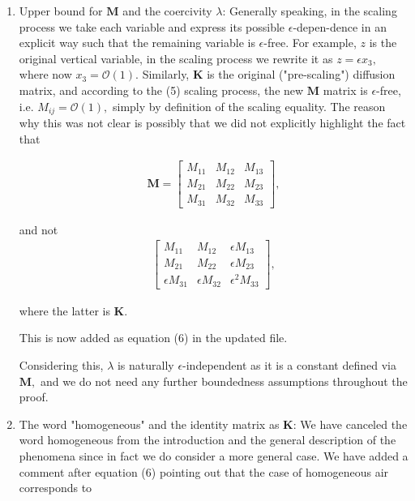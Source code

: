 \documentclass[11pt]{article}
\begin{document}
\begin{enumerate}

  \item Upper bound for $\mathbf{M}$ and the coercivity $\lambda$: Generally speaking, in the scaling process we take each variable and express its possible $\epsilon$-depen-dence in an explicit way such that the remaining variable is $\epsilon$-free. For example, $z$ is the original vertical variable, in the scaling process we rewrite it as $z = \epsilon x_3,$ where now $x_3 = \mathcal{O}(1).$ Similarly, $\mathbf{K}$ is the original ("pre-scaling") diffusion matrix, and according to the (5) scaling process, the new $\mathbf{M}$ matrix is $\epsilon$-free, i.e. $M_{ij} = \mathcal{O}(1),$ simply by definition of the scaling equality. The reason why this was not clear is possibly that we did not explicitly highlight the fact that
  
\begin{gather} \nonumber
 \mathbf{M}
 =
  \begin{bmatrix}
    M_{11} & M_{12} & M_{13} \\ M_{21} & M_{22} & M_{23} \\ M_{31} & M_{32} & M_{33}
  \end{bmatrix},
\end{gather}

and not 
\begin{gather} \nonumber
  \begin{bmatrix}
    M_{11} & M_{12} & \epsilon M_{13} \\ M_{21} & M_{22} & \epsilon M_{23} \\ \epsilon M_{31} & \epsilon M_{32} & \epsilon^2 M_{33}
  \end{bmatrix},
\end{gather}

where the latter is $\mathbf{K}.$

This is now added as equation (6) in the updated file.

Considering this, $\lambda$ is naturally $\epsilon$-independent as it is a constant defined via $\mathbf{M},$ and we do not need any further boundedness assumptions throughout the proof.
  
  \item The word "homogeneous" and the identity matrix as $\mathbf{K}$: We have canceled the word homogeneous from the introduction and the general description of the phenomena since in fact we do consider a more general case. We have added a comment after equation (6) pointing out that the case of homogeneous air corresponds to
  

\end{enumerate}
\end{document}
